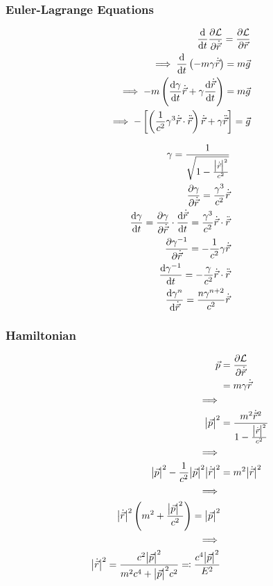 \documentclass[12pt]{article}
\newcommand{\magsq}[1]{\big|#1\big|^2}
\newcommand{\Lag}{\mathcal{L}}
\newcommand{\pos}{\vec{r}}
\newcommand{\vel}{\dot{\vec{r}}}
\newcommand{\acc}{\ddot{\vec{r}}}
\newcommand{\mom}{\vec{p}}
\begin{document}
\subsubsection*{Euler-Lagrange Equations}
\begin{align*}
    \dv{t}\pdv{\Lag}{\vel} = \pdv{\Lag}{\pos} \\
    \implies \dv{t}\left(-m\gamma\vel\right) = m\vec{g} \\
    \implies -m\left(\dv{\gamma}{t}\vel + \gamma\dv{\vel}{t} \right) = m\vec{g} \\
    \implies -\left[\left(\frac{1}{c^2}\gamma^3\vel\cdot\acc\right)\vel + \gamma\acc\right] = \vec{g}
\end{align*}

\begin{align*}
    \gamma = \frac{1}{\sqrt{1 - \frac{\magsq{\vel}}{c^2}}} \\
    \pdv{\gamma}{\vel} = \frac{\gamma^3}{c^2}\vel \\
    \dv{\gamma}{t} = \pdv{\gamma}{\vel}\cdot\dv{\vel}{t} = \frac{\gamma^3}{c^2} \vel\cdot\acc \\
    \pdv{\gamma^{-1}}{\vel} = -\frac{1}{c^2}\gamma\vel \\
    \dv{\gamma^{-1}}{t} = -\frac{\gamma}{c^2} \vel\cdot\acc \\
    \dv{\gamma^n}{\vel} = \frac{n\gamma^{n+2}}{c^2}\vel
\end{align*}

\subsubsection*{Hamiltonian}
\begin{align*}
    \mom &= \pdv{\Lag}{\vel} \\
    &= m\gamma\vel \\
    \implies \\
    \magsq{\mom} &= \frac{m^2\vel^2}{1 - \frac{\magsq{\vel}}{c^2}} \\
    \implies \\
    \magsq{\mom} - \frac{1}{c^2}\magsq{\mom}\magsq{\vel} &= m^2\magsq{\vel} \\
    \implies \\
    \magsq{\vel}\left(m^2 + \frac{\magsq{\mom}}{c^2}\right) = \magsq{\mom} \\
    \implies \\
    \magsq{\vel} = \frac{c^2\magsq{\mom}}{m^2c^4 + \magsq{\mom}c^2} \eqqcolon \frac{c^4\magsq{\mom}}{E^2}
\end{align*}
\end{document}
